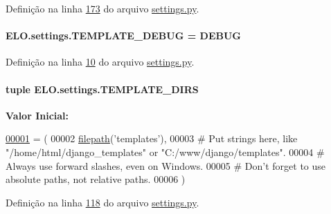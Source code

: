 Definição na linha \hyperlink{settings_8py_source_l00173}{173} do arquivo \hyperlink{settings_8py_source}{settings.\+py}.

\hypertarget{namespaceELO_1_1settings_a014930e0bf77feccc65c20212593381e}{}
\paragraph[{T\+E\+M\+P\+L\+A\+T\+E\+\_\+\+D\+E\+B\+U\+G}]{\setlength{\rightskip}{0pt plus 5cm}E\+L\+O.\+settings.\+T\+E\+M\+P\+L\+A\+T\+E\+\_\+\+D\+E\+B\+U\+G = {\bf D\+E\+B\+U\+G}}\label{namespaceELO_1_1settings_a014930e0bf77feccc65c20212593381e}


Definição na linha \hyperlink{settings_8py_source_l00010}{10} do arquivo \hyperlink{settings_8py_source}{settings.\+py}.

\hypertarget{namespaceELO_1_1settings_a4e977a41e98923ee4c93b24d22b3d7e2}{}
\paragraph[{T\+E\+M\+P\+L\+A\+T\+E\+\_\+\+D\+I\+R\+S}]{\setlength{\rightskip}{0pt plus 5cm}tuple E\+L\+O.\+settings.\+T\+E\+M\+P\+L\+A\+T\+E\+\_\+\+D\+I\+R\+S}\label{namespaceELO_1_1settings_a4e977a41e98923ee4c93b24d22b3d7e2}
{\bfseries Valor Inicial\+:}
\begin{DoxyCode}
\hypertarget{namespaceELO_1_1settings_l00001}{}\hyperlink{namespaceELO_1_1settings}{00001} = (
00002     \hyperlink{namespaceELO_1_1settings_a7730264ddd478343e0f282f36d4a5ab4}{filepath}(\textcolor{stringliteral}{'templates'}),
00003     \textcolor{comment}{# Put strings here, like "/home/html/django\_templates" or "C:/www/django/templates".}
00004     \textcolor{comment}{# Always use forward slashes, even on Windows.}
00005     \textcolor{comment}{# Don't forget to use absolute paths, not relative paths.}
00006 )
\end{DoxyCode}


Definição na linha \hyperlink{settings_8py_source_l00118}{118} do arquivo \hyperlink{settings_8py_source}{settings.\+py}.

